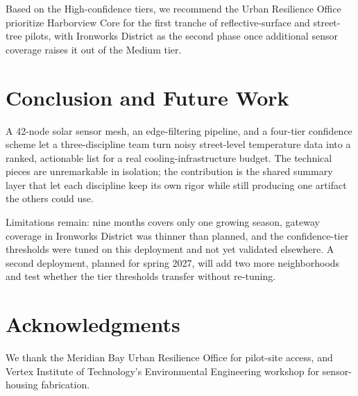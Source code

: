 \documentclass[10pt,twocolumn]{article}
\begin{document}
\begin{policybox}
Based on the High-confidence tiers, we recommend the Urban Resilience Office prioritize
Harborview Core for the first tranche of reflective-surface and street-tree pilots, with
Ironworks District as the second phase once additional sensor coverage raises it out of the
Medium tier.
\end{policybox}

\section{Conclusion and Future Work}
A 42-node solar sensor mesh, an edge-filtering pipeline, and a four-tier confidence scheme let a
three-discipline team turn noisy street-level temperature data into a ranked, actionable list for
a real cooling-infrastructure budget. The technical pieces are unremarkable in isolation; the
contribution is the shared summary layer that let each discipline keep its own rigor while still
producing one artifact the others could use.

Limitations remain: nine months covers only one growing season, gateway coverage in Ironworks
District was thinner than planned, and the confidence-tier thresholds were tuned on this
deployment and not yet validated elsewhere. A second deployment, planned for spring 2027, will
add two more neighborhoods and test whether the tier thresholds transfer without re-tuning.

\section*{Acknowledgments}
{\small We thank the Meridian Bay Urban Resilience Office for pilot-site access, and Vertex
Institute of Technology's Environmental Engineering workshop for sensor-housing fabrication.}
\end{document}
